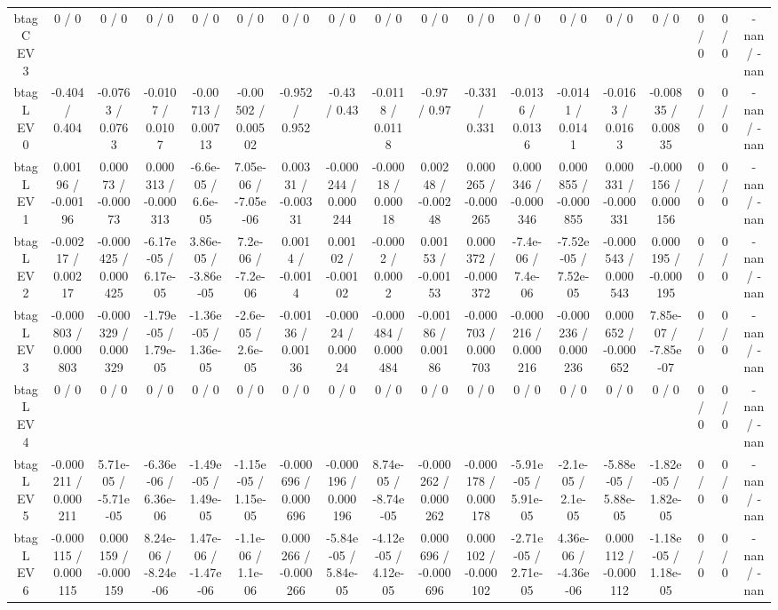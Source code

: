 \documentclass[10pt]{article}
\begin{document}
\begin{table}[htbp]
\begin{center}
\begin{tabular}{|c|c|c|c|c|c|c|c|c|c|c|c|c|c|c|c|c|c|}
  btag C EV 3 & 0 / 0 & 0 / 0 & 0 / 0 & 0 / 0 & 0 / 0 & 0 / 0 & 0 / 0 & 0 / 0 & 0 / 0 & 0 / 0 & 0 / 0 & 0 / 0 & 0 / 0 & 0 / 0 & 0 / 0 & 0 / 0 & -nan / -nan \\ 
  btag L EV 0 & -0.404 / 0.404 & -0.0763 / 0.0763 & -0.0107 / 0.0107 & -0.00713 / 0.00713 & -0.00502 / 0.00502 & -0.952 / 0.952 & -0.43 / 0.43 & -0.0118 / 0.0118 & -0.97 / 0.97 & -0.331 / 0.331 & -0.0136 / 0.0136 & -0.0141 / 0.0141 & -0.0163 / 0.0163 & -0.00835 / 0.00835 & 0 / 0 & 0 / 0 & -nan / -nan \\ 
  btag L EV 1 & 0.00196 / -0.00196 & 0.00073 / -0.00073 & 0.000313 / -0.000313 & -6.6e-05 / 6.6e-05 & 7.05e-06 / -7.05e-06 & 0.00331 / -0.00331 & -0.000244 / 0.000244 & -0.00018 / 0.00018 & 0.00248 / -0.00248 & 0.000265 / -0.000265 & 0.000346 / -0.000346 & 0.000855 / -0.000855 & 0.000331 / -0.000331 & -0.000156 / 0.000156 & 0 / 0 & 0 / 0 & -nan / -nan \\ 
  btag L EV 2 & -0.00217 / 0.00217 & -0.000425 / 0.000425 & -6.17e-05 / 6.17e-05 & 3.86e-05 / -3.86e-05 & 7.2e-06 / -7.2e-06 & 0.0014 / -0.0014 & 0.00102 / -0.00102 & -0.0002 / 0.0002 & 0.00153 / -0.00153 & 0.000372 / -0.000372 & -7.4e-06 / 7.4e-06 & -7.52e-05 / 7.52e-05 & -0.000543 / 0.000543 & 0.000195 / -0.000195 & 0 / 0 & 0 / 0 & -nan / -nan \\ 
  btag L EV 3 & -0.000803 / 0.000803 & -0.000329 / 0.000329 & -1.79e-05 / 1.79e-05 & -1.36e-05 / 1.36e-05 & -2.6e-05 / 2.6e-05 & -0.00136 / 0.00136 & -0.00024 / 0.00024 & -0.000484 / 0.000484 & -0.00186 / 0.00186 & -0.000703 / 0.000703 & -0.000216 / 0.000216 & -0.000236 / 0.000236 & 0.000652 / -0.000652 & 7.85e-07 / -7.85e-07 & 0 / 0 & 0 / 0 & -nan / -nan \\ 
  btag L EV 4 & 0 / 0 & 0 / 0 & 0 / 0 & 0 / 0 & 0 / 0 & 0 / 0 & 0 / 0 & 0 / 0 & 0 / 0 & 0 / 0 & 0 / 0 & 0 / 0 & 0 / 0 & 0 / 0 & 0 / 0 & 0 / 0 & -nan / -nan \\ 
  btag L EV 5 & -0.000211 / 0.000211 & 5.71e-05 / -5.71e-05 & -6.36e-06 / 6.36e-06 & -1.49e-05 / 1.49e-05 & -1.15e-05 / 1.15e-05 & -0.000696 / 0.000696 & -0.000196 / 0.000196 & 8.74e-05 / -8.74e-05 & -0.000262 / 0.000262 & -0.000178 / 0.000178 & -5.91e-05 / 5.91e-05 & -2.1e-05 / 2.1e-05 & -5.88e-05 / 5.88e-05 & -1.82e-05 / 1.82e-05 & 0 / 0 & 0 / 0 & -nan / -nan \\ 
  btag L EV 6 & -0.000115 / 0.000115 & 0.000159 / -0.000159 & 8.24e-06 / -8.24e-06 & 1.47e-06 / -1.47e-06 & -1.1e-06 / 1.1e-06 & 0.000266 / -0.000266 & -5.84e-05 / 5.84e-05 & -4.12e-05 / 4.12e-05 & 0.000696 / -0.000696 & 0.000102 / -0.000102 & -2.71e-05 / 2.71e-05 & 4.36e-06 / -4.36e-06 & 0.000112 / -0.000112 & -1.18e-05 / 1.18e-05 & 0 / 0 & 0 / 0 & -nan / -nan \\ 

\end{tabular}
\end{center}
\end{table}
\end{document}
